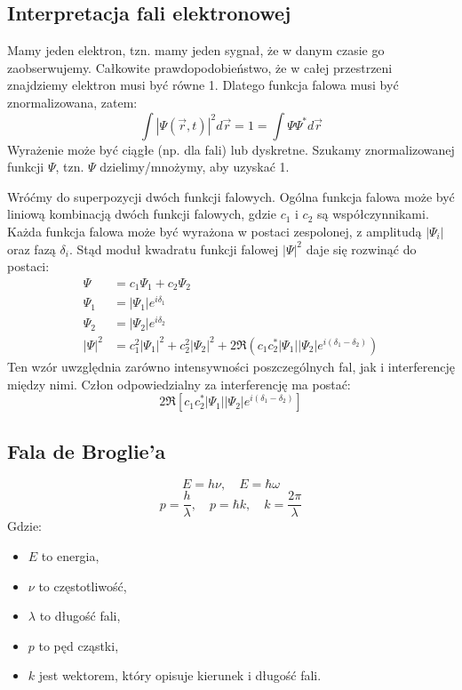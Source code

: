 \subsection{Interpretacja fali elektronowej}
Mamy jeden elektron, tzn. mamy jeden sygnał, że w danym czasie go zaobserwujemy.
Całkowite prawdopodobieństwo, że w całej przestrzeni znajdziemy elektron musi być równe 1.
Dlatego funkcja falowa musi być znormalizowana, zatem:
\[
\int |\Psi(\vec{r}, t)|^2 d\vec{r} = 1 = \int \Psi \Psi^* d\vec{r}
\]
Wyrażenie może być ciągłe (np. dla fali) lub dyskretne.
Szukamy znormalizowanej funkcji $\Psi$, tzn. $\Psi$ dzielimy/mnożymy, aby uzyskać 1.

Wróćmy do superpozycji dwóch funkcji falowych. Ogólna funkcja falowa może być liniową kombinacją dwóch funkcji falowych, gdzie $c_1$ i $c_2$ są współczynnikami.
Każda funkcja falowa może być wyrażona w postaci zespolonej, z amplitudą $|\Psi_i|$ oraz fazą $\delta_i$.
Stąd moduł kwadratu funkcji falowej $|\Psi|^2$ daje się rozwinąć do postaci:
\begin{align*}
\Psi &= c_1 \Psi_1 + c_2 \Psi_2\\
\Psi_1 &= |\Psi_1| e^{i \delta_1}\\
\Psi_2 &= |\Psi_2| e^{i \delta_2}\\
|\Psi|^2 &= c_1^2 |\Psi_1|^2 + c_2^2 |\Psi_2|^2 + 2 \Re (c_1 c_2^* |\Psi_1| |\Psi_2| e^{i (\delta_1 - \delta_2)})
\end{align*}
Ten wzór uwzględnia zarówno intensywności poszczególnych fal, jak i interferencję między nimi. Człon odpowiedzialny za interferencję ma postać:
\begin{equation*}
    2 \Re \left[ c_1 c_2^* |\Psi_1| |\Psi_2| e^{i (\delta_1 - \delta_2)} \right]
\end{equation*}

\subsection{Fala de Broglie'a}
\[
E = h\nu, \quad E = \hbar \omega
\]
\[
p = \frac{h}{\lambda}, \quad p = \hbar k, \quad k = \frac{2\pi}{\lambda}
\]
Gdzie:
\begin{itemize}
    \item $E$ to energia,
    \item $\nu$ to częstotliwość,
    \item $\lambda$ to długość fali,
    \item $p$ to pęd cząstki,
    \item $k$ jest wektorem, który opisuje kierunek i długość fali.
\end{itemize}

